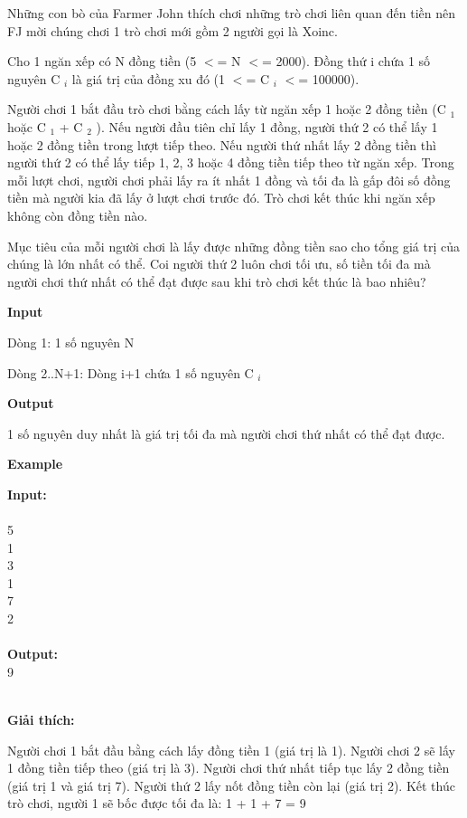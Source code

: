 















   Những con bò của Farmer John thích chơi những trò chơi liên quan đến tiền nên FJ mời chúng chơi 1 trò chơi mới gồm 2 người gọi là Xoinc.  

   Cho 1 ngăn xếp có N đồng tiền (5 $<$= N $<$= 2000). Đồng thứ i chứa 1 số nguyên C   $_    i   $   là giá trị của đồng xu đó (1 $<$= C   $_    i   $   $<$= 100000).  

   Người chơi 1 bắt đầu trò chơi bằng cách lấy từ ngăn xếp 1 hoặc 2 đồng tiền (C   $_    1   $   hoặc C   $_    1   $   + C   $_    2   $   ). Nếu người đầu tiên chỉ lấy 1 đồng, người thứ 2 có thể lấy 1 hoặc 2 đồng tiền trong lượt tiếp theo. Nếu người thứ nhất lấy 2 đồng tiền thì người thứ 2 có thể lấy tiếp 1, 2, 3 hoặc 4 đồng tiền tiếp theo từ ngăn xếp. Trong mỗi lượt chơi, người chơi phải lấy ra ít nhất 1 đồng và tối đa là gấp đôi số đồng tiền mà người kia đã lấy ở lượt chơi trước đó. Trò chơi kết thúc khi ngăn xếp không còn đồng tiền nào.  

   Mục tiêu của mỗi người chơi là lấy được những đồng tiền sao cho tổng giá trị của chúng là lớn nhất có thể. Coi người thứ 2 luôn chơi tối ưu, số tiền tối đa mà người chơi thứ nhất có thể đạt được sau khi trò chơi kết thúc là bao nhiêu?  



\textbf{    Input   }

   Dòng 1: 1 số nguyên N  

   Dòng 2..N+1: Dòng i+1 chứa 1 số nguyên C   $_    i   $

\textbf{    Output   }

   1 số nguyên duy nhất là giá trị tối đa mà người chơi thứ nhất có thể đạt được.  

\textbf{    Example   }

\textbf{    Input:   }
\\
\\   5   
\\   1   
\\   3   
\\   1   
\\   7   
\\   2   
\\
\\\textbf{    Output:   }
\\   9   
\\
\\\textbf{}

\textbf{     Giải thích:    }

   Người chơi 1 bắt đầu bằng cách lấy đồng tiền 1 (giá trị là 1). Người chơi 2 sẽ lấy 1 đồng tiền tiếp theo (giá trị là 3). Người chơi thứ nhất tiếp tục lấy 2 đồng tiền (giá trị 1 và giá trị 7). Người thứ 2 lấy nốt đồng tiền còn lại (giá trị 2). Kết thúc trò chơi, người 1 sẽ bốc được tối đa là: 1 + 1 + 7 = 9  

